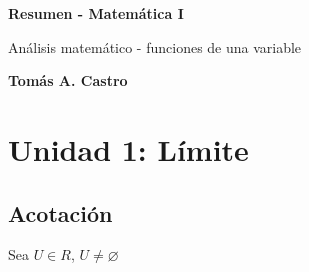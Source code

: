 \documentclass{report}
\begin{document}
	
\begin{titlepage}
	\begin{center}
		\vspace*{7cm}
		
		\Huge
		\textbf{Resumen - Matemática I}
		
		\vspace{1cm}
		\LARGE
		Análisis matemático - funciones de una variable
		
		\vspace{1.5cm}
		
		\textbf{Tomás A. Castro}
		
		
	\end{center}
\end{titlepage}

\renewcommand{\abstractname}{\Huge ACLARACIÓN\\}
\begin{abstract}
	
	{\Large Este es mi resumen de Matemática 1, como práctica para iniciarme en \LaTeX. Espero que el que quiera evacuar sus dudas sobre algún tema en alguna unidad le sirva para algo. Incluí algunas demostraciones que me parecieron interesantes, y también en varios casos complementé la teoría con observaciones personales mías.
	
	\textbf{Este material sólo de consulta. No utilizar en reemplazo del material o apuntes de estudio que ofrezca la cátedra.}
	
	Cualquier colaboración o sugerencia es bienvenida.
	
	\
	
	Tomás A. Castro
	
	tomacastro@itba.edu.ar}
\end{abstract}

\tableofcontents

\chapter{Unidad 1: Límite}
	\section{Acotación}
		Sea $U \in R$, $U \neq \varnothing$
	
\end{document}
